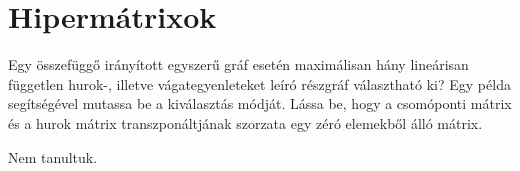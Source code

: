 \documentclass[../main.tex]{subfiles}
\begin{document}
\section{Hipermátrixok}

\begin{fulltheorem}
  Egy összefüggő irányított egyszerű gráf esetén maximálisan hány lineárisan
  független hurok-, illetve vágategyenleteket leíró részgráf választható ki?
  Egy példa segítségével mutassa be a kiválasztás módját. Lássa be, hogy a
  csomóponti mátrix és a hurok mátrix transzponáltjának szorzata egy zéró
  elemekből álló mátrix.
\end{fulltheorem}

Nem tanultuk.
\end{document}
